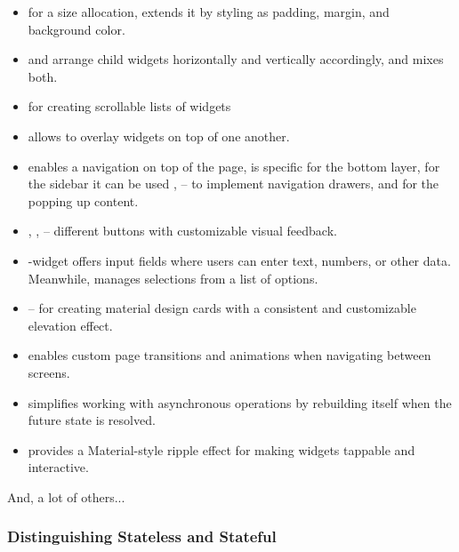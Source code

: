 \begin{itemize}
  \item {} for a size allocation,  extends it by styling as padding, margin, and background color.

  \item {} and  arrange child widgets horizontally and vertically accordingly, and   
  mixes both.

  \item {} for creating scrollable lists of widgets

  \item {} allows to overlay widgets on top of one another.

  \item {} enables a navigation on top of the page,  is specific for the bottom 
  layer, for the sidebar it can be used ,  -- to implement navigation drawers, and 
   for the popping up content.

  \item {}, ,  -- different buttons with customizable visual feedback.

  \item {}-widget offers input fields where users can enter text, numbers, or other data. Meanwhile,
   manages selections from a list of options.
  
  \item {} -- for creating material design cards with a consistent and customizable elevation effect.

  \item {} enables custom page transitions and animations when navigating between screens.

  \item {} simplifies working with asynchronous operations by rebuilding itself when the future state is 
  resolved.

  \item {} provides a Material-style ripple effect for making widgets tappable and interactive.
\end{itemize}

\noindent And, a lot of others...


\newpage
\subsubsection{Distinguishing Stateless and Stateful}

